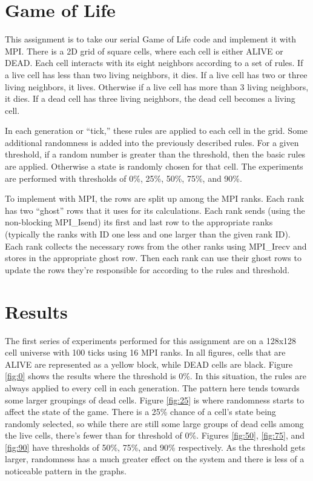 \documentclass[11pt]{article}
\numberwithin{figure}{section}
\begin{document}

\maketitle

\section{Game of Life}
This assignment is to take our serial Game of Life code and implement it with MPI.  There is a 2D grid of square cells, where each cell is either ALIVE or DEAD.  Each cell interacts with its eight neighbors according to a set of rules.  If a live cell has less than two living neighbors, it dies. If a live cell has two or three living neighbors, it lives.  Otherwise if a live cell has more than 3 living neighbors, it dies.  If a dead cell has three living neighbors, the dead cell becomes a living cell.  

In each generation or ``tick,'' these rules are applied to each cell in the grid.  Some additional randomness is added into the previously described rules.  For a given threshold, if a random number is greater than the threshold, then the basic rules are applied.  Otherwise a state is randomly chosen for that cell.  The experiments are performed with thresholds of 0\%, 25\%, 50\%, 75\%, and 90\%.  

To implement with MPI, the rows are split up among the MPI ranks.  Each rank has two ``ghost'' rows that it uses for its calculations.  Each rank sends (using the non-blocking MPI\_Isend) its first and last row to the appropriate ranks (typically the ranks with ID one less and one larger than the given rank ID).  Each rank collects the necessary rows from the other ranks using MPI\_Irecv and stores in the appropriate ghost row.  Then each rank can use their ghost rows to update the rows they're responsible for according to the rules and threshold.  
\section{Results}
The first series of experiments performed for this assignment are on a 128x128 cell universe with 100 ticks using 16 MPI ranks.  In all figures, cells that are ALIVE are represented as a yellow block, while DEAD cells are black.  Figure \ref{fig:0} shows the results where the threshold is 0\%.  In this situation, the rules are always applied to every cell in each generation.  The pattern here tends towards some larger groupings of dead cells.  Figure \ref{fig:25} is where randomness starts to affect the state of the game.  There is a 25\% chance of a cell's state being randomly selected, so while there are still some large groups of dead cells among the live cells, there's fewer than for threshold of 0\%.  Figures \ref{fig:50}, \ref{fig:75}, and \ref{fig:90} have thresholds of 50\%, 75\%, and 90\% respectively.  As the threshold gets larger, randomness has a much greater effect on the system and there is less of a noticeable pattern in the graphs.  
\end{document}
